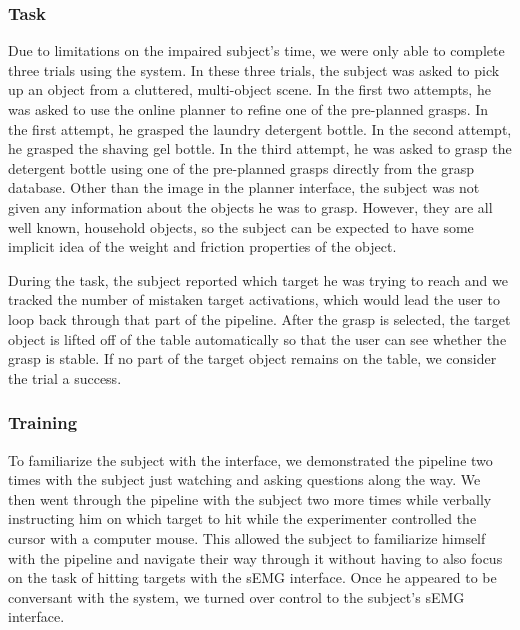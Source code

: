 \subsubsection{Task}
Due to limitations on the impaired subject's time, we were only able to complete three trials using the system. In these three trials,  the subject was asked to pick up an object from a cluttered, multi-object scene. In the first two attempts, he was asked to use the online planner to refine one of the pre-planned grasps. In the first attempt, he grasped the laundry detergent bottle. In the second attempt, he grasped the shaving gel bottle. In the third attempt, he was asked to grasp the detergent bottle using one of the pre-planned grasps directly from the grasp database. Other than the image in the planner interface, the subject was not given any information about the objects he was to grasp. However, they are all well known, household objects, so the subject can be expected to have some implicit idea of the weight and friction properties of the object. 


During the task, the subject reported which target he was trying to reach and we tracked the number of mistaken target activations, which would lead the user to loop back through that part of the pipeline. After the grasp is selected, the target object is lifted off of the table automatically so that the user can see whether the grasp is stable. If no part of the target object remains on the table, we consider the trial a success.

\subsubsection{Training}
To familiarize the subject with the interface, we demonstrated the pipeline two times with the subject just watching and asking questions along the way. We then went through the pipeline with the subject two more times while verbally instructing him on which target to hit while the experimenter controlled the cursor with a computer mouse. This allowed the subject to familiarize himself with the pipeline and navigate their way through it without having to also focus on the task of hitting targets with the sEMG interface. Once he appeared to be conversant with the system, we turned over control to the subject's sEMG interface.

